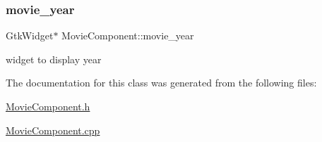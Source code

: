 \subsubsection{\texorpdfstring{movie\+\_\+year}{movie\_year}}
{\footnotesize\ttfamily Gtk\+Widget$\ast$ Movie\+Component\+::movie\+\_\+year}

widget to display year 

The documentation for this class was generated from the following files\+:\begin{DoxyCompactItemize}
\item 
\hyperlink{MovieComponent_8h}{Movie\+Component.\+h}\item 
\hyperlink{MovieComponent_8cpp}{Movie\+Component.\+cpp}\end{DoxyCompactItemize}
